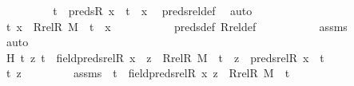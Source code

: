 \begin{isabellebody}
\ \ \ \ \ \ \isamarkupfalse%
\ \isamarkupfalse%
\ {\isachardoublequoteopen}t\ {\isasymin}\ preds{\isacharparenleft}{\kern0pt}R{\isacharcomma}{\kern0pt}\ x{\isacharparenright}{\kern0pt}\ {\isasymor}\ t\ {\isacharequal}{\kern0pt}\ x{\isachardoublequoteclose}\ \isamarkupfalse%
\ preds{\isacharunderscore}{\kern0pt}rel{\isacharunderscore}{\kern0pt}def\ \isamarkupfalse%
\ auto\ \isanewline
\ \ \ \ \ \ \isamarkupfalse%
\ \isamarkupfalse%
\ {\isachardoublequoteopen}{\isacharless}{\kern0pt}t{\isacharcomma}{\kern0pt}\ x{\isachargreater}{\kern0pt}\ {\isasymin}\ Rrel{\isacharparenleft}{\kern0pt}R{\isacharcomma}{\kern0pt}\ M{\isacharparenright}{\kern0pt}\ {\isasymor}\ t\ {\isacharequal}{\kern0pt}\ x{\isachardoublequoteclose}\ \isanewline
\ \ \ \ \ \ \ \ \isamarkupfalse%
\ preds{\isacharunderscore}{\kern0pt}def\ Rrel{\isacharunderscore}{\kern0pt}def\ \isanewline
\ \ \ \ \ \ \ \ \isamarkupfalse%
\ assms\ \isanewline
\ \ \ \ \ \ \ \ \isamarkupfalse%
\ auto\isanewline
\ \ \ \ \isamarkupfalse%
\isanewline
\isanewline
\ \ \ \ \isamarkupfalse%
\ H{\isacharcolon}{\kern0pt}\ {\isachardoublequoteopen}{\isasymAnd}t\ z{\isachardot}{\kern0pt}\ t\ {\isasymin}\ field{\isacharparenleft}{\kern0pt}preds{\isacharunderscore}{\kern0pt}rel{\isacharparenleft}{\kern0pt}R{\isacharcomma}{\kern0pt}\ x{\isacharparenright}{\kern0pt}{\isacharparenright}{\kern0pt}\ {\isasymLongrightarrow}\ z\ {\isasymin}\ Rrel{\isacharparenleft}{\kern0pt}R{\isacharcomma}{\kern0pt}\ M{\isacharparenright}{\kern0pt}\ {\isacharminus}{\kern0pt}{\isacharbackquote}{\kern0pt}{\isacharbackquote}{\kern0pt}\ {\isacharbraceleft}{\kern0pt}t{\isacharbraceright}{\kern0pt}\ {\isasymLongrightarrow}\ z\ {\isasymin}\ preds{\isacharunderscore}{\kern0pt}rel{\isacharparenleft}{\kern0pt}R{\isacharcomma}{\kern0pt}\ x{\isacharparenright}{\kern0pt}\ {\isacharminus}{\kern0pt}{\isacharbackquote}{\kern0pt}{\isacharbackquote}{\kern0pt}\ {\isacharbraceleft}{\kern0pt}t{\isacharbraceright}{\kern0pt}{\isachardoublequoteclose}\isanewline
\ \ \ \ \isamarkupfalse%
\ {\isacharminus}{\kern0pt}\ \isanewline
\ \ \ \ \ \ \isamarkupfalse%
\ t\ z\ \isanewline
\ \ \ \ \ \ \isamarkupfalse%
\ assms{}\ {\isacharcolon}{\kern0pt}\ {\isachardoublequoteopen}t\ {\isasymin}\ field{\isacharparenleft}{\kern0pt}preds{\isacharunderscore}{\kern0pt}rel{\isacharparenleft}{\kern0pt}R{\isacharcomma}{\kern0pt}\ x{\isacharparenright}{\kern0pt}{\isacharparenright}{\kern0pt}{\isachardoublequoteclose}\ {\isachardoublequoteopen}z\ {\isasymin}\ Rrel{\isacharparenleft}{\kern0pt}R{\isacharcomma}{\kern0pt}\ M{\isacharparenright}{\kern0pt}\ {\isacharminus}{\kern0pt}{\isacharbackquote}{\kern0pt}{\isacharbackquote}{\kern0pt}\ {\isacharbraceleft}{\kern0pt}t{\isacharbraceright}{\kern0pt}{\isachardoublequoteclose}\ \isanewline

\end{isabellebody}
